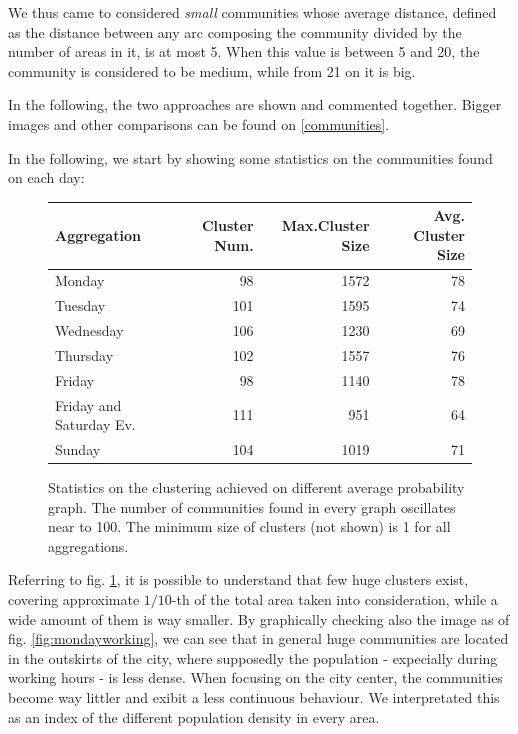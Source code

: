 \documentclass[12pt,a4paper]{article}
\begin{document}
We thus came to considered \emph{small} communities whose average distance, defined as the distance between any arc composing the community divided by the number of areas in it, is at most 5. When this value is between 5 and 20, the community is considered to be medium, while from 21 on it is big.

In the following, the two approaches are shown and commented together. Bigger images and other comparisons can be found on \ref{communities}. 

In the following, we start by showing some statistics on the communities found on each day:

\begin{figure}[H]
\centering
\begin{tabular}{| l | r | r | r |}
\hline
\textbf{Aggregation} & \textbf{Cluster Num.} & \textbf{Max.Cluster Size} & \textbf{Avg. Cluster Size} \\ \hline
Monday & 98 & 1572 & 78 \\ \hline
Tuesday & 101 & 1595 & 74 \\ \hline
Wednesday & 106 & 1230  & 69 \\ \hline
Thursday & 102 & 1557  & 76 \\ \hline
Friday &  98 & 1140 & 78 \\ \hline
Friday and Saturday Ev. & 111 & 951 & 64 \\ \hline
Sunday & 104 & 1019 & 71 \\ \hline
\end{tabular}
\caption{Statistics on the clustering achieved on different average probability graph. The number of communities found
in every graph oscillates near to 100. The minimum size of clusters (not shown) is 1 for all aggregations.}
\label{fig:foundClusters}
\end{figure}

Referring to fig. \ref{fig:foundClusters}, it is possible to understand that few huge clusters exist, covering approximate $1/10$-th of the total area taken into consideration, while a wide amount of them is way smaller.
By graphically checking also the image as of fig. \ref{fig:mondayworking}, we can see that in general huge communities are located in the outskirts of the city, where supposedly the population - expecially during working hours - is less dense. When focusing on the city center, the communities become way littler and exibit a less continuous behaviour. We interpretated this as an index of the different population density in every area.
\end{document}
